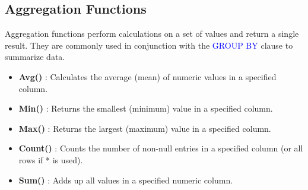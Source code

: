 \subsection{Aggregation Functions}
\begin{tcolorbox}[title = Definition]
   Aggregation functions perform calculations on a set of values and return a single result. They are commonly used in conjunction with the \textcolor{blue}{GROUP BY} clause to summarize data.
   \begin{itemize}
    \item \textbf{Avg()} : Calculates the average (mean) of numeric values in a specified column.
    \item \textbf{Min()} : Returns the smallest (minimum) value in a specified column.
    \item \textbf{Max()} : Returns the largest (maximum) value in a specified column.
    \item \textbf{Count()} : Counts the number of non-null entries in a specified column (or all rows if * is used).
    \item \textbf{Sum()} : Adds up all values in a specified numeric column.
   \end{itemize} 
\end{tcolorbox}


